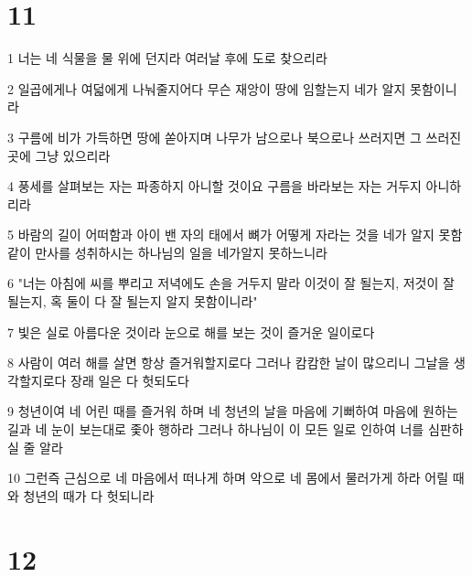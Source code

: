 \chapter{11}

\par 1 너는 네 식물을 물 위에 던지라 여러날 후에 도로 찾으리라
\par 2 일곱에게나 여덟에게 나눠줄지어다 무슨 재앙이 땅에 임할는지 네가 알지 못함이니라
\par 3 구름에 비가 가득하면 땅에 쏟아지며 나무가 남으로나 북으로나 쓰러지면 그 쓰러진 곳에 그냥 있으리라
\par 4 풍세를 살펴보는 자는 파종하지 아니할 것이요 구름을 바라보는 자는 거두지 아니하리라
\par 5 바람의 길이 어떠함과 아이 밴 자의 태에서 뼈가 어떻게 자라는 것을 네가 알지 못함같이 만사를 성취하시는 하나님의 일을 네가알지 못하느니라
\par 6 "너는 아침에 씨를 뿌리고 저녁에도 손을 거두지 말라 이것이 잘 될는지, 저것이 잘 될는지, 혹 둘이 다 잘 될는지 알지 못함이니라"
\par 7 빛은 실로 아름다운 것이라 눈으로 해를 보는 것이 즐거운 일이로다
\par 8 사람이 여러 해를 살면 항상 즐거워할지로다 그러나 캄캄한 날이 많으리니 그날을 생각할지로다 장래 일은 다 헛되도다
\par 9 청년이여 네 어린 때를 즐거워 하며 네 청년의 날을 마음에 기뻐하여 마음에 원하는 길과 네 눈이 보는대로 좇아 행하라 그러나 하나님이 이 모든 일로 인하여 너를 심판하실 줄 알라
\par 10 그런즉 근심으로 네 마음에서 떠나게 하며 악으로 네 몸에서 물러가게 하라 어릴 때와 청년의 때가 다 헛되니라

\chapter{12}

